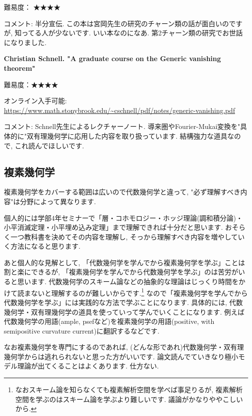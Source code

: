 難易度： ★★★★\vspace{-6pt} 

コメント: 半分宣伝. この本は宮岡先生の研究のチャーン類の話が面白いのですが, 知ってる人が少ないです. いい本なのになあ. 第2チャーン類の研究でお世話になりました. 

\textbf{Christian Schnell. "A graduate course on the Generic vanishing theorem" }  \vspace{-6pt} 

難易度：★★★★\vspace{-6pt} 

オンライン入手可能: \url{https://www.math.stonybrook.edu/~cschnell/pdf/notes/generic-vanishing.pdf} \vspace{-6pt} 

コメント: Schnell先生によるレクチャーノート. 導来圏やFourier-Mukai変換を"具体的に"双有理幾何学に応用した内容を取り扱っています. 結構強力な道具なので, これ読んでほしいです. 
\vspace{8pt}

\subsection{複素幾何学}
複素幾何学をカバーする範囲は広いので代数幾何学と違って, "必ず理解すべき内容"は分野によって異なります.  

個人的には学部4年セミナーで「層・コホモロジー・ホッジ理論(調和積分論)・小平消滅定理・小平埋め込み定理」まで理解できれば十分だと思います. 
おそらく一つ教科書を決めてその内容を理解し, そっから理解すべき内容を増やしていく方法になると思ります. 

あと個人的な見解として, 「代数幾何学を学んでから複素幾何学を学ぶ」ことは割と楽にできるが, 「複素幾何学を学んでから代数幾何学を学ぶ」のは苦労がいると思います. 代数幾何学のスキーム論などの抽象的な理論はじっくり時間をかけて読まないと理解するのが難しいからです.\footnote{なおスキーム論を知らなくても複素解析空間を学べば事足りるが, 複素解析空間を学ぶのはスキーム論を学ぶより難しいです. 議論がかなりややこしいから. } 
なので「複素幾何学を学んでから代数幾何学を学ぶ」には実践的な方法で学ぶことになります. 
具体的には, 代数幾何学・双有理幾何学の道具を使っていって学んでいくことになります. 
例えば代数幾何学の用語(ample, psefなど)を複素幾何学の用語(positive, with semipositive curvature current)に翻訳するなどです. 

なお複素幾何学を専門にするのであれば, (どんな形であれ)代数幾何学・双有理幾何学からは逃れられないと思った方がいいです. 論文読んでていきなり極小モデル理論が出てくることはよくあります. 仕方ない.  

